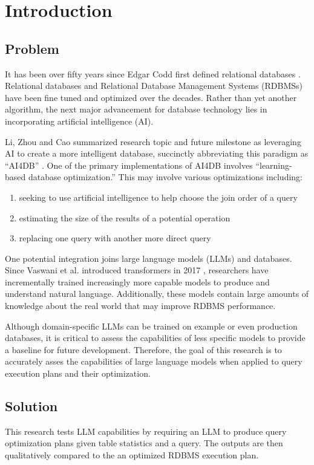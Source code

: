 \section{Introduction}
\subsection{Problem}
It has been over fifty years since Edgar Codd first defined relational databases \cite{codd1970}. Relational databases and Relational Database Management Systems (RDBMSs) have been fine tuned and optimized over the decades. Rather than yet another algorithm, the next major advancement for database technology lies in incorporating artificial intelligence (AI).

Li, Zhou and Cao summarized research topic and future milestone as leveraging AI to create a more intelligent database, succinctly abbreviating this paradigm as ``AI4DB'' \cite{li2021}. One of the primary implementations of AI4DB involves ``learning-based database optimization.'' This may involve various optimizations including:
\begin{enumerate}
  \item seeking to use artificial intelligence to help choose the join order of a query
  \item estimating the size of the results of a potential operation
  \item replacing one query with another more direct query
\end{enumerate}

One potential integration joins large language models (LLMs) and databases. Since Vaswani et al. introduced transformers in 2017 \cite{vaswani2017}, researchers have incrementally trained increasingly more capable models to produce and understand natural language. Additionally, these models contain large amounts of knowledge about the real world that may improve RDBMS performance.

Although domain-specific LLMs can be trained on example or even production databases, it is critical to assess the capabilities of less specific models to provide a baseline for future development. Therefore, the goal of this research is to accurately asses the capabilities of large language models when applied to query execution plans and their optimization.

\subsection{Solution}
This research tests LLM capabilities by requiring an LLM to produce query optimization plans given table statistics and a query. The outputs are then qualitatively compared to the an optimized RDBMS execution plan.

